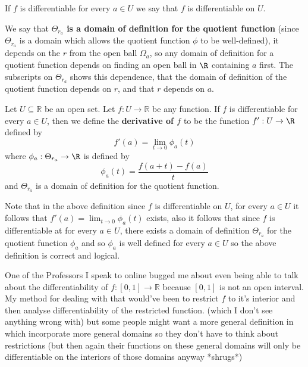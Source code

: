 	
	\begin{remark}[1]
		If $f$ is differentiable for every $a \in U$ we say that $f$ is differentiable on $U$. 
	\end{remark}
	
	
	\begin{remark}[2]
		We say that \textbf{$\Theta_{r_a}$ is a domain of definition for the quotient function} (since $\Theta_{r_a}$ is a domain which allows the quotient function $\phi$ to be well-defined), it depends on the $r$ from the open ball $\Omega_a$, so any domain of definition for a quotient function depends on finding an open ball in $\R$ containing $a$ first. The subscripts on $\Theta_{r_a}$ shows this dependence, that the domain of definition of the quotient function depends on $r$, and that $r$ depends on $a$.
	\end{remark}
	

	\begin{definition}
		Let $U \subseteq \mathbb{R}$ be an open set. Let $f : U \to \mathbb{R}$ be any function. If $f$ is differentiable for every $a \in U$, then we define the \textbf{derivative of $f$} to be the function  $f' : U \to \R$ defined by $$f'(a) = \lim_{t \to 0}\phi_{a}(t)$$ where $\phi_a : \Theta_{r_a} \to \R$ is defined by $$\phi_a(t) = \frac{f(a+t)-f(a)}{t}$$ and $\Theta_{r_a}$ is a domain of definition for the quotient function.
	\end{definition}
	
	
	\begin{remark}
		Note that in the above definition since $f$ is differentiable on $U$, for every $a \in U$ it follows that $f'(a) = \lim_{t \to 0}\phi_{a}(t)$ exists, also it follows that since $f$ is differentiable at for every $a \in U$, there exists a domain of definition $\Theta_{r_a}$ for the quotient function $\phi_a$ and so $\phi_a$ is well defined for every $a \in U$  so the above definition is correct and logical. 
	\end{remark}
	

	
	One of the Professors I speak to online bugged me about even being able to talk  about the differentiability of $f : [0, 1] \to \mathbb{R}$ because $[0, 1]$ is not an open interval. My method for dealing with that would've been to restrict $f$ to it's interior and then analyse differentiability of the restricted function. (which I don't see anything wrong with) but some people might want a more general definition in which incorporate more general domains so they don't have to think about restrictions (but then again their functions on these general domains will only be differentiable on the interiors of those domains anyway *shrugs*)
	
